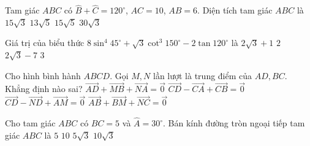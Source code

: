 \begin{ex}%
	Tam giác $ABC$ có $\widehat{B}+\widehat{C}=120^\circ$, $AC=10$, $AB=6$. Diện tích tam giác $ABC$ là
	\choice
		{\True $15\sqrt{3}$}
		{$13\sqrt{5}$}
		{$15\sqrt{5}$}
		{$30\sqrt{3}$}
\end{ex}

\begin{ex}%
	Giá trị của biểu thức $8\sin^4 45^\circ+\sqrt{3}\cot^3 150^\circ-2\tan 120^\circ$ là
	\choice
		{$2\sqrt{3}+1$}
		{$2$}
		{\True $2\sqrt{3}-7$}
		{$3$}
\end{ex}

\begin{ex}%
	Cho hình bình hành $ABCD$. Gọi $M,N$ lần lượt là trung điểm của $AD,BC$. Khẳng định nào sai?
	\choice
		{$\overrightarrow{AD}+\overrightarrow{MB}+\overrightarrow{NA}=\vec{0}$}
		{$\overrightarrow{CD}-\overrightarrow{CA}+\overrightarrow{CB}=\vec{0}$}
		{$\overrightarrow{CD}-\overrightarrow{ND}+\overrightarrow{AM}=\vec{0}$}
		{\True $\overrightarrow{AB}+\overrightarrow{BM}+\overrightarrow{NC}=\vec{0}$}
\end{ex}

\begin{ex}%
	Cho tam giác $ABC$ có $BC=5$ và $\widehat{A}=30^\circ$. Bán kính đường tròn ngoại tiếp tam giác $ABC$ là
	\choice
		{\True $5$}
		{$10$}
		{$5\sqrt{3}$}
		{$10\sqrt{3}$}
\end{ex}

